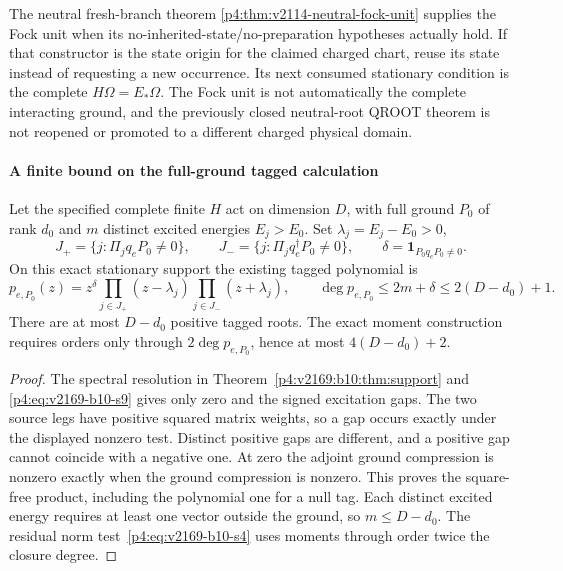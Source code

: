 \documentclass[12pt,a4paper]{article}
\begin{document}
The neutral fresh-branch theorem
\ref{p4:thm:v2114-neutral-fock-unit} supplies the Fock unit when its
no-inherited-state/no-preparation hypotheses actually hold. If that constructor
is the state origin for the claimed charged chart, reuse its state instead of
requesting a new occurrence. Its next consumed stationary condition is the
complete $H\Omega=E_*\Omega$. The Fock unit is not automatically the complete
interacting ground, and the previously closed neutral-root QROOT theorem is
not reopened or promoted to a different charged physical domain.




\paragraph{A finite bound on the full-ground tagged calculation}
\begin{corollary}
\label{p4:cor:v2174-full-ground-degree-bound}
Let the specified complete finite $H$ act on dimension $D$, with full ground
$P_0$ of rank $d_0$ and $m$ distinct excited energies $E_j>E_0$.
Set $\lambda_j=E_j-E_0>0$,
\[
 J_+=\{j:\Pi_jq_eP_0\ne0\},\qquad
 J_-=\{j:\Pi_jq_e^\dagger P_0\ne0\},\qquad
 \delta=\mathbf1_{P_0q_eP_0\ne0}.
\]
On this exact stationary support the existing tagged polynomial is
\begin{equation}
 p_{e,P_0}(z)=z^\delta
       \prod_{j\in J_+}(z-\lambda_j)
       \prod_{j\in J_-}(z+\lambda_j),\qquad
 \deg p_{e,P_0}\le2m+\delta\le2(D-d_0)+1.
 \label{p4:eq:v2174-full-ground-degree-bound}
\end{equation}
There are at most $D-d_0$ positive tagged roots. The exact moment
construction requires orders only through $2\deg p_{e,P_0}$, hence at most
$4(D-d_0)+2$.
\end{corollary}
\begin{proof}
The spectral resolution in
Theorem~\ref{p4:v2169:b10:thm:support} and
\eqref{p4:eq:v2169-b10-s9} gives only zero and the signed excitation gaps.
The two source legs have positive squared matrix weights, so a gap occurs
exactly under the displayed nonzero test. Distinct positive gaps are
different, and a positive gap cannot coincide with a negative one.
At zero the adjoint ground compression is nonzero exactly when the ground
compression is nonzero. This proves the square-free product, including
the polynomial one for a null tag. Each distinct excited energy requires
at least one vector outside the ground, so $m\le D-d_0$.
The residual norm test~\eqref{p4:eq:v2169-b10-s4} uses moments through
order twice the closure degree.
\end{proof}
\end{document}
